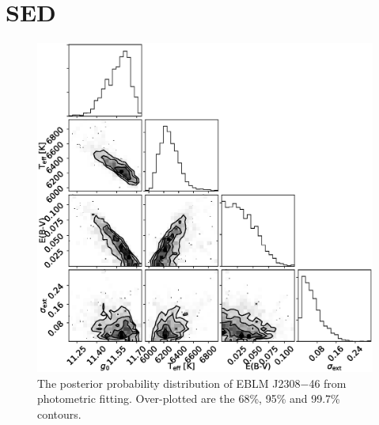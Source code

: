 \chapter{SED}\label{appendix:SED_fits}

\begin{figure}
    \centering
    \includegraphics[scale=0.5]{Appendix/SED_fits/J2308-46.eps}
    \caption{The posterior probability distribution of EBLM J2308$-$46 from photometric fitting. Over-plotted are the 68\%, 95\% and 99.7\% contours.}
    \label{appendix:fig:SED_J2308-46}
\end{figure}

